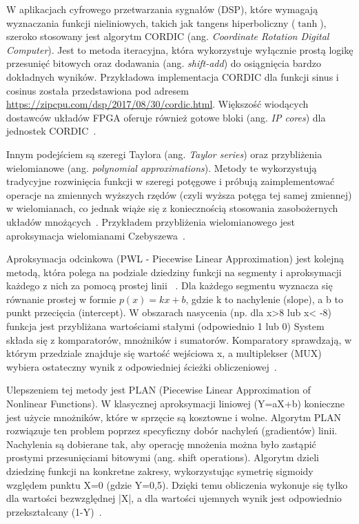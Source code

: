 \documentclass[12pt, a4paper, oneside]{scrreprt}
\begin{document}
W aplikacjach cyfrowego przetwarzania sygnałów (DSP), które wymagają wyznaczania funkcji nieliniowych,
takich jak tangens hiperboliczny ($\tanh$), szeroko stosowany jest algorytm CORDIC (ang. \textit{Coordinate Rotation Digital Computer}).
Jest to metoda iteracyjna, która wykorzystuje wyłącznie prostą logikę przesunięć
bitowych oraz dodawania (ang. \textit{shift-add}) do osiągnięcia bardzo dokładnych wyników.
Przykładowa implementacja CORDIC dla funkcji sinus i cosinus została przedstawiona pod
adresem \url{https://zipcpu.com/dsp/2017/08/30/cordic.html}. Większość wiodących dostawców układów
FPGA oferuje również gotowe bloki (ang. \textit{IP cores}) dla jednostek CORDIC~\cite{thedatabus}.

Innym podejściem są szeregi Taylora (ang. \textit{Taylor series}) oraz przybliżenia wielomianowe (ang. \textit{polynomial approximations}).
Metody te wykorzystują tradycyjne rozwinięcia funkcji w szeregi potęgowe i próbują zaimplementować operacje na zmiennych
wyższych rzędów (czyli wyższa potęga tej samej zmiennej) w wielomianach, co jednak wiąże się z koniecznością stosowania zasobożernych układów mnożących~\cite{thedatabus}.
Przykładem przybliżenia wielomianowego jest aproksymacja wielomianami Czebyszewa~\cite{Vlcek}.


Aproksymacja odcinkowa (PWL - Piecewise Linear Approximation) jest kolejną metodą, która polega
na podziale dziedziny funkcji na segmenty i aproksymacji każdego z nich za pomocą prostej
linii ~\cite{bohrium}. Dla każdego segmentu wyznacza się równanie prostej w formie $p(x)=kx+b$,
gdzie k to nachylenie (slope), a b to punkt przecięcia (intercept). W obszarach nasycenia
(np. dla x>8 lub x< -8) funkcja jest przybliżana wartościami stałymi (odpowiednio 1 lub 0)
System składa się z komparatorów, mnożników i sumatorów.
Komparatory sprawdzają, w którym przedziale znajduje się wartość wejściowa x, a multiplekser
(MUX) wybiera ostateczny wynik z odpowiedniej ścieżki obliczeniowej~\cite{Li2022}.

Ulepszeniem tej metody jest PLAN (Piecewise Linear Approximation of Nonlinear Functions).
W klasycznej aproksymacji liniowej (Y=aX+b) konieczne jest użycie mnożników, które w sprzęcie są kosztowne i wolne.
Algorytm PLAN rozwiązuje ten problem poprzez specyficzny dobór nachyleń (gradientów) linii.
Nachylenia są dobierane tak, aby operację mnożenia można było zastąpić prostymi przesunięciami
bitowymi (ang. shift operations). Algorytm dzieli dziedzinę funkcji na konkretne zakresy,
wykorzystując symetrię sigmoidy względem punktu X=0 (gdzie Y=0,5). Dzięki temu obliczenia
wykonuje się tylko dla wartości bezwzględnej |X|, a dla wartości ujemnych wynik jest
odpowiednio przekształcany (1-Y)~\cite{PLAN}.
\end{document}
